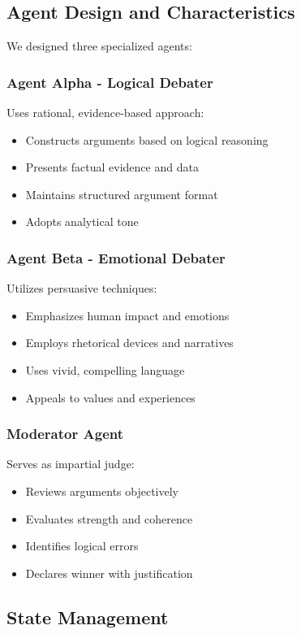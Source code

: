 \documentclass[conference]{IEEEtran}
\begin{document}
\subsection{Agent Design and Characteristics}

We designed three specialized agents:

\subsubsection{Agent Alpha - Logical Debater}
Uses rational, evidence-based approach:
\begin{itemize}
\item Constructs arguments based on logical reasoning
\item Presents factual evidence and data
\item Maintains structured argument format
\item Adopts analytical tone
\end{itemize}

\subsubsection{Agent Beta - Emotional Debater}
Utilizes persuasive techniques:
\begin{itemize}
\item Emphasizes human impact and emotions
\item Employs rhetorical devices and narratives
\item Uses vivid, compelling language
\item Appeals to values and experiences
\end{itemize}

\subsubsection{Moderator Agent}
Serves as impartial judge:
\begin{itemize}
\item Reviews arguments objectively
\item Evaluates strength and coherence
\item Identifies logical errors
\item Declares winner with justification
\end{itemize}

\subsection{State Management}
\end{document}
